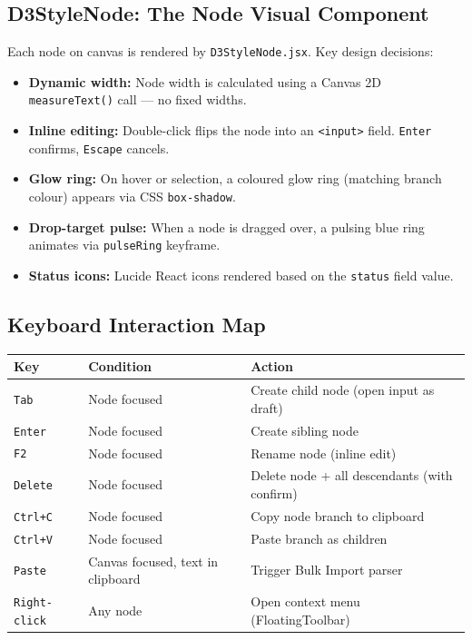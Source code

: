 \documentclass[12pt, a4paper]{article}
\begin{document}
\subsection{D3StyleNode: The Node Visual Component}
Each node on canvas is rendered by \texttt{D3StyleNode.jsx}. Key design decisions:
\begin{itemize}[noitemsep]
  \item \textbf{Dynamic width:} Node width is calculated using a Canvas 2D \texttt{measureText()} call — no fixed widths.
  \item \textbf{Inline editing:} Double-click flips the node into an \texttt{<input>} field. \texttt{Enter} confirms, \texttt{Escape} cancels.
  \item \textbf{Glow ring:} On hover or selection, a coloured glow ring (matching branch colour) appears via CSS \texttt{box-shadow}.
  \item \textbf{Drop-target pulse:} When a node is dragged over, a pulsing blue ring animates via \texttt{pulseRing} keyframe.
  \item \textbf{Status icons:} Lucide React icons rendered based on the \texttt{status} field value.
\end{itemize}

\subsection{Keyboard Interaction Map}
\begin{center}
\begin{tabular}{lll}
\toprule
\textbf{Key} & \textbf{Condition} & \textbf{Action} \\
\midrule
\texttt{Tab} & Node focused & Create child node (open input as draft) \\
\texttt{Enter} & Node focused & Create sibling node \\
\texttt{F2} & Node focused & Rename node (inline edit) \\
\texttt{Delete} & Node focused & Delete node + all descendants (with confirm) \\
\texttt{Ctrl+C} & Node focused & Copy node branch to clipboard \\
\texttt{Ctrl+V} & Node focused & Paste branch as children \\
\texttt{Paste} & Canvas focused, text in clipboard & Trigger Bulk Import parser \\
\texttt{Right-click} & Any node & Open context menu (FloatingToolbar) \\
\bottomrule
\end{tabular}
\end{center}
\end{document}
